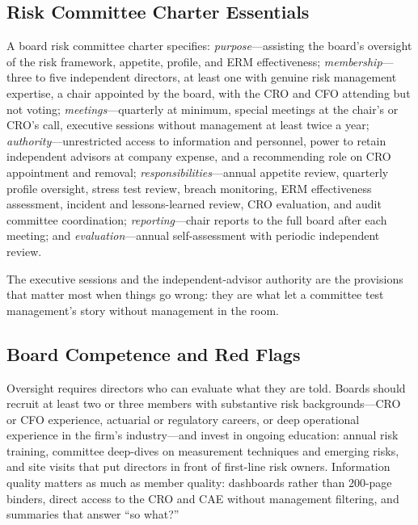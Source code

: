 \documentclass[11pt,openany]{book}
\begin{document}
\subsection{Risk Committee Charter Essentials}

A board risk committee charter specifies: \emph{purpose}---assisting the
board's oversight of the risk framework, appetite, profile, and ERM
effectiveness; \emph{membership}---three to five independent directors, at
least one with genuine risk management expertise, a chair appointed by the
board, with the CRO and CFO attending but not voting;
\emph{meetings}---quarterly at minimum, special meetings at the chair's or
CRO's call, executive sessions without management at least twice a year;
\emph{authority}---unrestricted access to information and personnel, power to
retain independent advisors at company expense, and a recommending role on
CRO appointment and removal; \emph{responsibilities}---annual appetite
review, quarterly profile oversight, stress test review, breach monitoring,
ERM effectiveness assessment, incident and lessons-learned review, CRO
evaluation, and audit committee coordination; \emph{reporting}---chair
reports to the full board after each meeting; and \emph{evaluation}---annual
self-assessment with periodic independent review.

The executive sessions and the independent-advisor authority are the
provisions that matter most when things go wrong: they are what let a
committee test management's story without management in the room.

\subsection{Board Competence and Red Flags}

Oversight requires directors who can evaluate what they are told. Boards
should recruit at least two or three members with substantive risk
backgrounds---CRO or CFO experience, actuarial or regulatory careers, or deep
operational experience in the firm's industry---and invest in ongoing
education: annual risk training, committee deep-dives on measurement
techniques and emerging risks, and site visits that put directors in front of
first-line risk owners. Information quality matters as much as member
quality: dashboards rather than 200-page binders, direct access to the CRO
and CAE without management filtering, and summaries that answer ``so what?''
\end{document}
